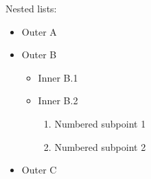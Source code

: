 \noindent Nested lists:
\par
\begin{itemize}
  \item Outer A
  \item Outer B
  \begin{itemize}
    \item Inner B.1
    \item Inner B.2
    \begin{enumerate}
      \item Numbered subpoint 1
      \item Numbered subpoint 2
    \end{enumerate}
  \end{itemize}
  \item Outer C
\end{itemize}
